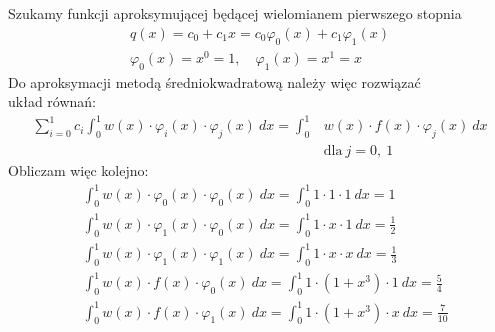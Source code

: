 \documentclass{article}
\begin{document}
\subsection{}
Szukamy funkcji aproksymującej będącej wielomianem pierwszego stopnia
\begin{gather*}
    q(x) = c_0 + c_1 x = c_0 \varphi_0(x) + c_1 \varphi_1(x)\\
    \varphi_0(x) = x^0 = 1,\quad \varphi_1(x) = x^1 = x
\end{gather*}
Do aproksymacji metodą średniokwadratową należy więc rozwiązać\\
układ równań:
\begin{align*}
    \sum_{i=0}^1 c_i \int_0^1 w(x) \cdot \varphi_i(x) \cdot \varphi_j(x)\ dx = \int_0^1 &w(x) \cdot f(x) \cdot \varphi_j(x)\ dx\\
    &\text{dla}\ j = 0,\ 1
\end{align*}
Obliczam więc kolejno:
\begin{align*}
    &\int_0^1 w(x) \cdot \varphi_0(x) \cdot \varphi_0(x)\ dx = \int_0^1 1 \cdot 1 \cdot 1\ dx = 1\\
    &\int_0^1 w(x) \cdot \varphi_1(x) \cdot \varphi_0(x)\ dx = \int_0^1 1 \cdot x \cdot 1\ dx = \frac{1}{2}\\
    &\int_0^1 w(x) \cdot \varphi_1(x) \cdot \varphi_1(x)\ dx = \int_0^1 1 \cdot x \cdot x\ dx = \frac{1}{3}\\
    &\int_0^1 w(x) \cdot f(x) \cdot \varphi_0(x)\ dx = \int_0^1 1 \cdot (1 + x^3) \cdot 1\ dx = \frac{5}{4}\\
    &\int_0^1 w(x) \cdot f(x) \cdot \varphi_1(x)\ dx = \int_0^1 1 \cdot (1 + x^3) \cdot x\ dx = \frac{7}{10}
\end{align*}
\end{document}
